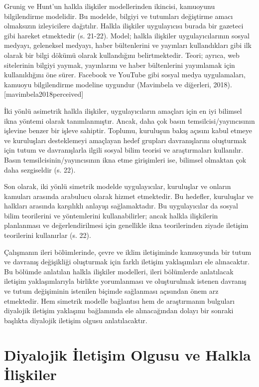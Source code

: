 \documentclass[
]{book}
\begin{document}
Grunig ve Hunt'un halkla ilişkiler modellerinden ikincisi, kamuoyunu bilgilendirme modelidir. Bu modelde, bilgiyi ve tutumları değiştirme amacı olmaksızın izleyicilere dağıtılır. Halkla ilişkiler uygulayıcısı burada bir gazeteci gibi hareket etmektedir (s. 21-22). \citep{grunig1984managing} Model; halkla ilişkiler uygulayıcılarının sosyal medyayı, geleneksel medyayı, haber bültenlerini ve yayınları kullandıkları gibi ilk olarak bir bilgi dökümü olarak kullandığını belirtmektedir. Teori; ayrıca, web sitelerinin bilgiyi yaymak, yayınlarını ve haber bültenlerini yayımlamak için kullanıldığını öne sürer. Facebook ve YouTube gibi sosyal medya uygulamaları, kamuoyu bilgilendirme modeline uygundur (Mavimbela ve diğerleri, 2018). {[}mavimbela2018perceived{]}

İki yönlü asimetrik halkla ilişkiler, uygulayıcıların amaçları için en iyi bilimsel ikna yöntemi olarak tanımlanmıştır. Ancak, daha çok basın temsilcisi/yayıncısının işlevine benzer bir işleve sahiptir. Toplumu, kuruluşun bakış açısını kabul etmeye ve kuruluşları desteklemeyi amaçlayan hedef grupları davranışlarını oluşturmak için tutum ve davranışlarla ilgili sosyal bilim teorisi ve araştırmaları kullanılır. Basın temsilcisinin/yayıncısının ikna etme girişimleri ise, bilimsel olmaktan çok daha sezgiseldir (s. 22). \citep{grunig1984managing}

Son olarak, iki yönlü simetrik modelde uygulayıcılar, kuruluşlar ve onların kamuları arasında arabulucu olarak hizmet etmektedir. Bu hedefler, kuruluşlar ve halkları arasında karşılıklı anlayışı sağlamaktadır. Bu uygulayıcılar da sosyal bilim teorilerini ve yöntemlerini kullanabilirler; ancak halkla ilişkilerin planlanması ve değerlendirilmesi için genellikle ikna teorilerinden ziyade iletişim teorilerini kullanırlar (s. 22). \citep{grunig1984managing}

Çalışmanın ileri bölümlerinde, çevre ve iklim iletişiminde kamuoyunda bir tutum ve davranış değişikliği oluşturmak için farklı iletişim yaklaşımları ele alınacaktır. Bu bölümde anlatılan halkla ilişkiler modelleri, ileri bölümlerde anlatılacak iletişim yaklaşımlarıyla birlikte yorumlanması ve oluşturulmak istenen davranış ve tutum değişiminin istenilen biçimde sağlanması açısından önem arz etmektedir.
Hem simetrik modelle bağlantısı hem de araştırmanın bulguları diyalojik iletişim yaklaşımı bağlamında ele alınacağından dolayı bir sonraki başlıkta diyalojik iletişim olgusu anlatılacaktır.

\hypertarget{diyalojik-iletiux15fim-olgusu-ve-halkla-iliux15fkiler}{%
\section{Diyalojik İletişim Olgusu ve Halkla İlişkiler}\label{diyalojik-iletiux15fim-olgusu-ve-halkla-iliux15fkiler}}
\end{document}
